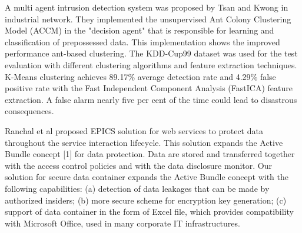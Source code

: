 \documentclass[conference]{IEEEtran}
\begin{document}
\par A multi agent intrusion detection system was proposed by Tsan and Kwong \cite{c3} in industrial network. They implemented the unsupervised Ant Colony Clustering Model (ACCM) in the "decision agent" that is responsible for learning and classification of prepossessed data. This implementation shows the improved performance ant-based clustering. The KDD-Cup99 dataset was used for the test evaluation with different clustering algorithms and feature extraction techniques. K-Means clustering achieves 89.17\% average detection rate and  4.29\% false positive rate with the Fast Independent Component Analysis (FastICA) feature extraction. A false alarm nearly five per cent of the time could lead to disastrous consequences.

Ranchal et al \cite{c10} proposed EPICS solution for web services to protect data throughout the service interaction lifecycle. This solution expands the Active Bundle concept [1] for data protection. Data are stored and transferred together with the access control policies and with the data disclosure monitor. Our solution for secure data container expands the Active Bundle concept with the following capabilities:
(a) detection of data leakages that can be made by authorized insiders;
(b) more secure scheme for encryption key generation;
(c) support of data container in the form of Excel file, which provides compatibility with Microsoft Office, used in many corporate IT infrastructures.  
                                                                            
\end{document}
